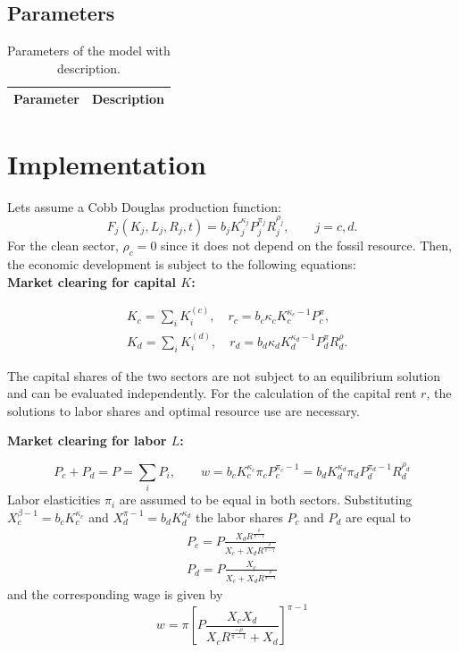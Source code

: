 \subsection{Parameters}

\begin{table}[H]
	\centering
	\begin{tabular}{r|l}
		Parameter & Description \\\hline
		
	\end{tabular}
	\caption{Parameters of the model with description.}
	\label{tab:parameters}
\end{table}


\section{Implementation}

Lets assume a Cobb Douglas production function:
\begin{equation}
	F_j(K_j,L_j,R_j,t) = b_j K_j^{\kappa_j}P_j^{\pi_j}R_j^{\rho_j}, \qquad j = c,d.
	\label{cobb_douglas}
\end{equation}
For the clean sector, $\rho_c = 0$ since it does not depend on the fossil resource.
Then, the economic development is subject to the following equations:\\

\textbf{Market clearing for capital $K$:}

\begin{align}
	&K_c = \sum_i K_i^{(c)}, \quad r_c = b_c\kappa_c K_c^{\kappa_c-1} P_c^{\pi}, \\
	&K_d = \sum_i K_i^{(d)}, \quad r_d = b_d\kappa_d K_d^{\kappa_d-1} P_d^{\pi}R_d^{\rho}.
	\label{capital_market_clearing}
\end{align}

The capital shares of the two sectors are not subject to an equilibrium solution and can be evaluated independently. For the calculation of the capital rent $r$, the solutions to labor shares and optimal resource use are necessary.

\textbf{Market clearing for labor $L$:}

\begin{equation}
	P_c + P_d = P = \sum_i P_i, \qquad w = b_c K_c^{\kappa_c}\pi_c P_c^{\pi_c-1}=  b_d K_d^{\kappa_d}\pi_d P_d^{\pi_d-1}R_d^{\rho_d} 
	\label{labour_market_clearing}
\end{equation}
Labor elasticities $\pi_i$ are assumed to be equal in both sectors. 
Substituting $X_c^{\beta-1} = b_c K_c^{\kappa_c}$ and $X_d^{\pi-1} = b_d K_d^{\kappa_d}$ the labor shares $P_c$ and $P_d$ are equal to
\begin{align}
	P_c = P \frac{X_d R^{\frac{\rho}{\pi-1}}}{X_c + X_d R^{\frac{\rho}{\pi-1}}} \label{labor_share_Pc}  \\
	P_d = P \frac{X_c}{X_c + X_d R^{\frac{\rho}{\pi-1}}} \label{labor_share_Pd}	
\end{align}
and the corresponding wage is given by
\begin{equation}
	w = \pi \left[ P \frac{X_c X_d}{X_c R^{\frac{-\rho}{\pi-1}} + X_d} \right]^{\pi-1}
	\label{wage}
\end{equation}



